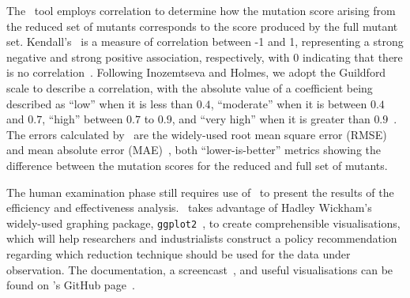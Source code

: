 
The \mr~tool employs correlation to determine how the mutation score arising from the reduced set of mutants corresponds
to the score produced by the full mutant set. Kendall's \taub~is a measure of correlation between -1 and 1, representing
a strong negative and strong positive association, respectively, with 0 indicating that there is no
correlation~\cite{mcleod2015kendall}. Following Inozemtseva and Holmes, we adopt the Guildford scale to describe a
correlation, with the absolute value of a coefficient being described as ``low'' when it is less than $0.4$,
``moderate'' when it is between $0.4$ and $0.7$, ``high'' between $0.7$ to $0.9$, and ``very high'' when it is greater
than $0.9$~\cite{inozemtseva2014coverage}. The errors calculated by \mr~are the widely-used root mean square error
(RMSE) and mean absolute error (MAE)~\cite{chai2014root}, both ``lower-is-better'' metrics showing the difference
between the mutation scores for the reduced and full set of mutants.




The human examination phase still requires use of \mr~to present the results of the efficiency and
effectiveness analysis. \mr~takes advantage of Hadley Wickham's widely-used graphing package,
\texttt{ggplot2}~\cite{ggplot2}, to create comprehensible visualisations, which will help researchers and
industrialists construct a policy recommendation regarding which reduction technique should be used for the
data under observation. The documentation, a screencast~\cite{asciinema}, and useful visualisations can be
found on \mr's GitHub page~\cite{tool}.


